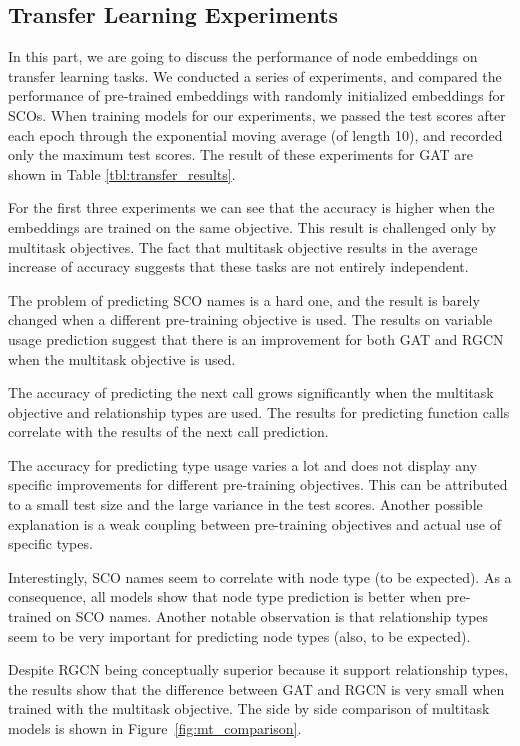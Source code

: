 \documentclass[a4paper,twoside]{article}
\begin{document}
\subsection{Transfer Learning Experiments}

In this part, we are going to discuss the performance of node embeddings on transfer learning tasks. We conducted a series of experiments, and compared the performance of pre-trained embeddings with randomly initialized embeddings for SCOs. When training models for our experiments, we passed the test scores after each epoch through the exponential moving average (of length 10), and recorded only the maximum test scores. The result of these experiments for GAT are shown in Table \ref{tbl:transfer_results}.

For the first three experiments we can see that the accuracy is higher when the embeddings are trained on the same objective. This result is challenged only by multitask objectives. The fact that multitask objective results in the average increase of accuracy suggests that these tasks are not entirely independent.

The problem of predicting SCO names is a hard one, and the result is barely changed when a different pre-training objective is used. The results on variable usage prediction suggest that there is an improvement for both GAT and RGCN when the multitask objective is used. 

The accuracy of predicting the next call grows significantly when the multitask objective and relationship types are used. The results for predicting function calls correlate with the results of the next call prediction. 

The accuracy for predicting type usage varies a lot and does not display any specific improvements for different pre-training objectives. This can be attributed to a small test size and the large variance in the test scores. Another possible explanation is a weak coupling between pre-training objectives and actual use of specific types. 

Interestingly, SCO names seem to correlate with node type (to be expected). As a consequence, all models show that node type prediction is better when pre-trained on SCO names. Another notable observation is that relationship types seem to be very important for predicting node types (also, to be expected).

Despite RGCN being conceptually superior because it support relationship types, the results show that the difference between GAT and RGCN is very small when trained with the multitask objective. The side by side comparison of multitask models is shown in Figure~\ref{fig:mt_comparison}. 
\end{document}
